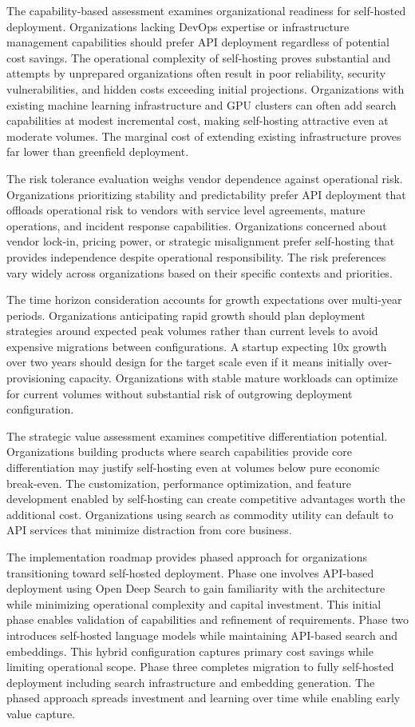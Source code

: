 The capability-based assessment examines organizational readiness for self-hosted deployment. Organizations lacking DevOps expertise or infrastructure management capabilities should prefer API deployment regardless of potential cost savings. The operational complexity of self-hosting proves substantial and attempts by unprepared organizations often result in poor reliability, security vulnerabilities, and hidden costs exceeding initial projections. Organizations with existing machine learning infrastructure and GPU clusters can often add search capabilities at modest incremental cost, making self-hosting attractive even at moderate volumes. The marginal cost of extending existing infrastructure proves far lower than greenfield deployment.

The risk tolerance evaluation weighs vendor dependence against operational risk. Organizations prioritizing stability and predictability prefer API deployment that offloads operational risk to vendors with service level agreements, mature operations, and incident response capabilities. Organizations concerned about vendor lock-in, pricing power, or strategic misalignment prefer self-hosting that provides independence despite operational responsibility. The risk preferences vary widely across organizations based on their specific contexts and priorities.

The time horizon consideration accounts for growth expectations over multi-year periods. Organizations anticipating rapid growth should plan deployment strategies around expected peak volumes rather than current levels to avoid expensive migrations between configurations. A startup expecting 10x growth over two years should design for the target scale even if it means initially over-provisioning capacity. Organizations with stable mature workloads can optimize for current volumes without substantial risk of outgrowing deployment configuration.

The strategic value assessment examines competitive differentiation potential. Organizations building products where search capabilities provide core differentiation may justify self-hosting even at volumes below pure economic break-even. The customization, performance optimization, and feature development enabled by self-hosting can create competitive advantages worth the additional cost. Organizations using search as commodity utility can default to API services that minimize distraction from core business.

The implementation roadmap provides phased approach for organizations transitioning toward self-hosted deployment. Phase one involves API-based deployment using Open Deep Search to gain familiarity with the architecture while minimizing operational complexity and capital investment. This initial phase enables validation of capabilities and refinement of requirements. Phase two introduces self-hosted language models while maintaining API-based search and embeddings. This hybrid configuration captures primary cost savings while limiting operational scope. Phase three completes migration to fully self-hosted deployment including search infrastructure and embedding generation. The phased approach spreads investment and learning over time while enabling early value capture.

